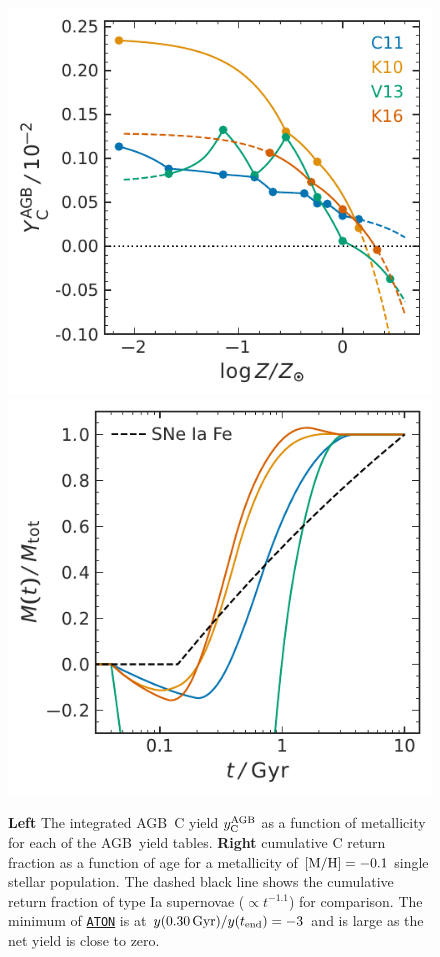 \documentclass[fleqn,
referee, %
usenatbib]{mnras}
\newcommand{\aton}{\texttt{\hyperlink{aton}{ATON}}}
\newcommand{\agb}{AGB}
\newcommand{\Ycagb}{{y_{\rm C}^{\rm AGB}}}
\begin{document}
\begin{figure}
    \centering
    \includegraphics{y_agb_vs_z.pdf}
    \includegraphics{y_agb_vs_t.pdf}

    \caption[]{\textbf{Left} The integrated \agb\ C yield $\Ycagb$ as a function of metallicity for each of the \agb\ yield tables.
        \textbf{Right} cumulative C return fraction as a function of age for a metallicity of ${\rm [M/H]}=-0.1$ single stellar population. The dashed black line shows the cumulative return fraction of type Ia supernovae ($\propto t^{-1.1}$) for comparison. The minimum of \aton{} is at $y( 0.30\,{\rm Gyr})/y(t_{\rm end})=-3$ and is large as the net yield is close to zero.
}

    \label{fig:agb-ssp}

\end{figure}
\end{document}
